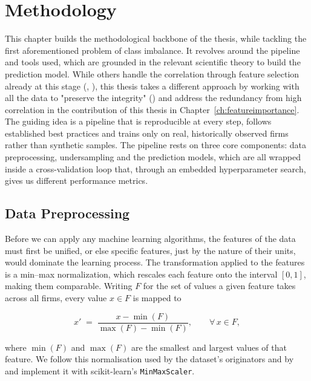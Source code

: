 \chapter{Methodology}
\label{ch:methodology}

This chapter builds the methodological backbone of the thesis, while tackling the first aforementioned problem of class imbalance. 
It revolves around the pipeline and tools used, which are grounded in the relevant scientific 
theory to build the prediction model. While others handle the correlation through feature selection already at this stage 
(\textcite{pham2025}, \textcite{chaudhary2023}), this thesis takes a different approach by working with all the data to 
"preserve the integrity" (\textcite[5]{wangliu2021}) and address the redundancy from high correlation in the contribution of 
this thesis in Chapter~\ref{ch:featureimportance}. The guiding idea is a pipeline that is reproducible at every step, follows 
established best practices and trains only on real, historically observed firms rather than synthetic samples. 
The pipeline rests on three core components: data preprocessing, undersampling and the prediction models, which are all 
wrapped inside a cross-validation loop that, through an embedded hyperparameter search, gives us different performance metrics.


\section{Data Preprocessing}
\label{sec:preprocessing}

Before we can apply any machine learning algorithms, the features of the data
must first be unified, or else specific features, just by the nature of their
units, would dominate the learning process. The transformation applied to the
features is a min--max normalization, which rescales each feature onto the
interval $[0,1]$, making them comparable. Writing $F$ for the set of
values a given feature takes across all firms, every value $x \in F$ is mapped to

\begin{equation}
  x' \;=\; \frac{x - \min(F)}{\max(F) - \min(F)}, \qquad \forall\, x \in F,
  \label{eq:minmax}
\end{equation}

where $\min(F)$ and $\max(F)$ are the smallest and largest values of that
feature. We follow this normalisation used by the dataset's originators
\parencite[562--563]{liang2016} and by \textcite[5]{wangliu2021} and implement
it with scikit-learn's \texttt{MinMaxScaler}.


